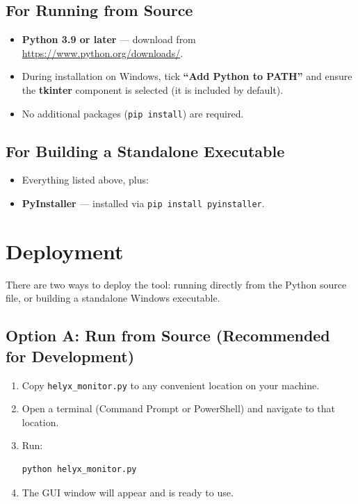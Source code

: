 \documentclass[12pt]{article}
\begin{document}
\subsection{For Running from Source}

\begin{itemize}[nosep]
    \item \textbf{Python 3.9 or later} --- download from \url{https://www.python.org/downloads/}.
    \item During installation on Windows, tick \textbf{``Add Python to PATH''} and ensure the \textbf{tkinter} component is selected (it is included by default).
    \item No additional packages (\texttt{pip install}) are required.
\end{itemize}

\subsection{For Building a Standalone Executable}

\begin{itemize}[nosep]
    \item Everything listed above, plus:
    \item \textbf{PyInstaller} --- installed via \texttt{pip install pyinstaller}.
\end{itemize}

\section{Deployment}

There are two ways to deploy the tool: running directly from the Python source file, or building a standalone Windows executable.

\subsection{Option A: Run from Source (Recommended for Development)}

\begin{enumerate}[nosep]
    \item Copy \texttt{helyx\_monitor.py} to any convenient location on your machine.
    \item Open a terminal (Command Prompt or PowerShell) and navigate to that location.
    \item Run:
\begin{lstlisting}
python helyx_monitor.py
\end{lstlisting}
    \item The GUI window will appear and is ready to use.
\end{enumerate}
\end{document}
